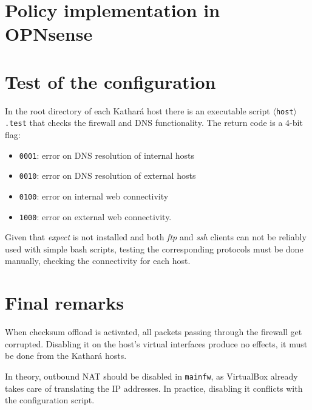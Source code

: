 \documentclass[draft]{homework}
\newcommand{\kat}{Kathará\xspace}
\newcommand{\mainfw}{\texttt{mainfw}\xspace}
\newcommand{\opn}{OPNsense\xspace}
\newcommand{\vb}{VirtualBox\xspace}
\begin{document}
    
    \section{Policy implementation in \opn}
    
    
    \section{Test of the configuration}
    In the root directory of each \kat  host there is an executable script \texttt{$\langle$host$\rangle$.test} that checks the firewall and DNS functionality.
    The return code is a 4-bit flag:
    \begin{itemize}
        \item \texttt{0001}: error on DNS resolution of internal hosts
        \item \texttt{0010}: error on DNS resolution of external hosts
        \item \texttt{0100}: error on internal web connectivity
        \item \texttt{1000}: error on external web connectivity.
    \end{itemize}
    
    Given that \textit{expect} is not installed and both \textit{ftp} and \textit{ssh} clients can not be reliably used with simple bash scripts, testing the corresponding protocols must be done manually, checking the connectivity for each host.
    
    
    \section{Final remarks}
    When checksum offload is activated, all packets passing through the firewall get corrupted. Disabling it on the host's virtual interfaces produce no effects, it must be done from the \kat hosts.
    
    In theory, outbound NAT should be disabled in \mainfw, as \vb already takes care of translating the IP addresses. In practice, disabling it conflicts with the configuration script.
\end{document}
